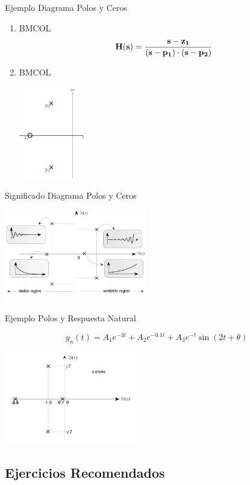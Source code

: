 {Ejemplo Diagrama Polos y Ceros}

\begin{enumerate}
\item \hfill{}\textsc{BMCOL}
\label{sec:orgf1fdd07}
\[
\mathbf{H}(\mathbf{s}) = \frac{\mathbf{s} - \mathbf{z_1}}{(\mathbf{s} - \mathbf{p_1}) \cdot (\mathbf{s} - \mathbf{p_2})}
\]
\item \hfill{}\textsc{BMCOL}
\label{sec:org3b5b90a}
\begin{center}
\includegraphics[height=4cm]{../figs/InterpretacionGeometrica0.pdf}
\end{center}
\end{enumerate}

{Significado Diagrama Polos y Ceros}

\begin{center}
\includegraphics[height=4cm]{../figs/PoleZero.pdf}
\end{center}

{Ejemplo Polos y Respuesta Natural}


\[
  y_n(t) = A_1 e^{-3t} + A_2 e^{-0.1 t} + A_3 e^{-t} \sin(2 t + \theta)
\]
\begin{center}
\includegraphics[height=4cm]{../figs/Ejemplo_Polos.pdf}
\end{center}


\subsection{Ejercicios Recomendados}


